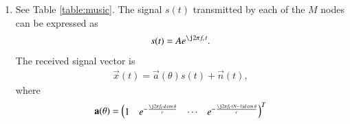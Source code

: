 \documentclass[journal,12pt,twocolumn]{IEEEtran}
\renewcommand\thesection{\arabic{section}}
\begin{document}
\begin{enumerate}[label=\thesection.\arabic*
,ref=\thesection.\theenumi]
%
\item See Table \ref{table:music}. The signal $s(t)$ transmitted  by  each of the $M$ nodes can be expressed as
%
\begin{align}
s(t) = A e^{\j 2 \pi f_c t}.
\end{align}
%
The received signal vector is 
\begin{align}
\vec{x}(t) = \vec{a}(\theta)s(t)  + \vec{n}(t), 
\end{align}
%
where 
\begin{align}
\vec{a}(\theta) = \myvec{1 & e^{-\frac{\j 2 \pi f_c d\cos\theta}{c}} & \cdots & e^{-\frac{\j 2 \pi f_c \brak{N-1}d\cos\theta}{c}}}^T
\end{align}
\begin{table}[!h]
\centering
%

\caption{}
\label{table:music}
\end{table}

%
%
%
\end{enumerate}
\end{document}
